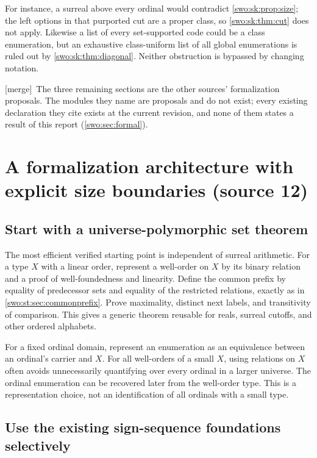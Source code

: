 \documentclass[11pt]{article}
\theoremstyle{definition}
\theoremstyle{remark}
\newcommand{\merge}{\textsf{[merge]}}
\begin{document}
For instance, a surreal above every ordinal would contradict
\cref{swo:sk:prop:size}; the left options in that purported cut are a proper
class, so \cref{swo:sk:thm:cut} does not apply. Likewise a list of every
set-supported code could be a class enumeration, but an exhaustive
class-uniform list of all global enumerations is ruled out by
\cref{swo:sk:thm:diagonal}. Neither obstruction is bypassed by changing
notation.


\merge\ The three remaining sections are the other sources' formalization
proposals. The modules they name are proposals and do not exist; every
existing declaration they cite exists at the current revision, and none of
them states a result of this report (\cref{swo:sec:formal}).

\section{A formalization architecture with explicit size boundaries (source 12)}
\label{swo:st:sec:formalization}

\subsection{Start with a universe-polymorphic set theorem}

The most efficient verified starting point is independent of surreal
arithmetic. For a type $X$ with a linear order, represent a well-order on
$X$ by its binary relation and a proof of well-foundedness and linearity.
Define the common prefix by equality of predecessor sets and equality of
the restricted relations, exactly as in \cref{swo:st:sec:commonprefix}.
Prove maximality, distinct next labels, and transitivity of comparison.
This gives a generic theorem reusable for reals, surreal cutoffs, and
other ordered alphabets.

For a fixed ordinal domain, represent an enumeration as an equivalence
between an ordinal's carrier and $X$. For all well-orders of a small $X$,
using relations on $X$ often avoids unnecessarily quantifying over every
ordinal in a larger universe. The ordinal enumeration can be recovered
later from the well-order type. This is a representation choice, not an
identification of all ordinals with a small type.

\subsection{Use the existing sign-sequence foundations selectively}
\end{document}
